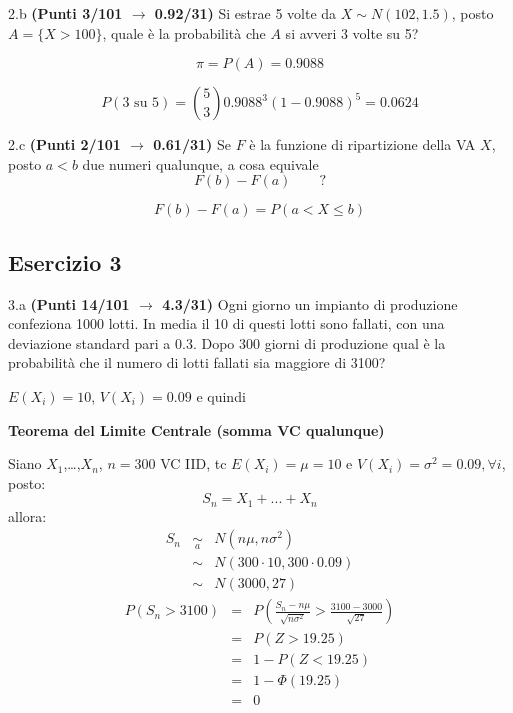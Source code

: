 \documentclass[
  11pt,
]{book}
\theoremstyle{mytheoremstyle}
\theoremstyle{mydefstyle}
\newenvironment{sol}
  {
  \begin{tcolorbox}[enhanced,breakable,arc=0.1mm,boxrule=1pt,colback=white,colframe=iblue,
  title=\bf \fontfamily{lmss}\selectfont \hspace{.5 cm} Soluzione,drop fuzzy shadow]

}{
\end{tcolorbox}
  }
\begin{document}
2.b \textbf{(Punti 3/101 \(\rightarrow\) 0.92/31)} Si estrae 5 volte da \(X\sim N(102,1.5)\), posto \(A=\{X>100\}\), quale è la probabilità che \(A\) si avveri 3 volte su 5?

\begin{sol}
\[
\pi=P(A)=0.9088
\]

\[
P(3\text{ su }5)=\binom{5}{3}0.9088^3(1-0.9088)^5=0.0624
\]

\end{sol}

2.c \textbf{(Punti 2/101 \(\rightarrow\) 0.61/31)} Se \(F\) è la funzione di ripartizione della VA \(X\), posto \(a < b\) due numeri qualunque, a cosa equivale
\[
F(b)-F(a) \qquad?
\]

\begin{sol}
\[
F(b)-F(a) = P(a<X\le b)
\]

\end{sol}

\subsection{Esercizio 3}\label{esercizio-3-9}

3.a \textbf{(Punti 14/101 \(\rightarrow\) 4.3/31)} Ogni giorno un impianto di produzione confeziona 1000 lotti. In media il 10 di questi lotti sono fallati, con una deviazione standard pari a 0.3. Dopo 300 giorni di produzione qual è la probabilità che il numero di lotti fallati sia maggiore di 3100?

\begin{sol}
\(E(X_i)=10\), \(V(X_i)=0.09\) e quindi

\textbf{Teorema del Limite Centrale (somma VC qualunque)}

Siano \(X_1\),\ldots,\(X_n\), \(n=300\) VC IID, tc \(E(X_i)=\mu=10\) e \(V(X_i)=\sigma^2=0.09,\forall i\), posto:
\[
      S_n = X_1 + ... + X_n
      \]
allora:\begin{eqnarray*}
  S_n & \mathop{\sim}\limits_{a}& N(n\mu,n\sigma^2) \\
     &\sim & N(300\cdot10,300\cdot0.09) \\
     &\sim & N(3000,27) 
  \end{eqnarray*}\begin{eqnarray*}
      P( S_n   >   3100 ) 
        &=& P\left(  \frac { S_n  -  n\mu }{ \sqrt{n\sigma^2} }  >  \frac { 3100  -  3000 }{\sqrt{ 27 }} \right)  \\
                 &=& P\left(  Z   >   19.25 \right) \\    &=& 1-P(Z< 19.25 )\\ 
                 &=&  1-\Phi( 19.25 ) \\ &=&  0 
      \end{eqnarray*}

\end{sol}
\end{document}
